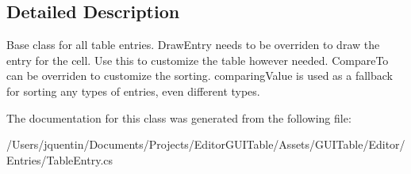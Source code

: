 \subsection{Detailed Description}
Base class for all table entries. Draw\+Entry needs to be overriden to draw the entry for the cell. Use this to customize the table however needed. Compare\+To can be overriden to customize the sorting. comparing\+Value is used as a fallback for sorting any types of entries, even different types. 



The documentation for this class was generated from the following file\+:\begin{DoxyCompactItemize}
\item 
/\+Users/jquentin/\+Documents/\+Projects/\+Editor\+G\+U\+I\+Table/\+Assets/\+G\+U\+I\+Table/\+Editor/\+Entries/Table\+Entry.\+cs\end{DoxyCompactItemize}
